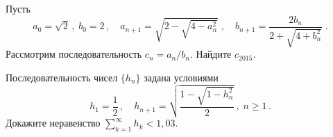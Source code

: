 \begin{problems}
\item
Пусть
\[
    a_0 = \sqrt{2}
\, , \;
    b_0 = 2
\, , \quad
    a_{n+1} = \sqrt{\textstyle 2 - \sqrt{4 - a^2_n}}
\; , \quad
    b_{n+1} = \frac{2 b_n}{2 + \sqrt{4 + b^2_n}}
\; . \]
Рассмотрим последовательность $c_n = a_n / b_n$.
Найдите $c_{2015}$.

\item
Последовательность чисел $\{ h_n \}$ задана условиями
\[
    h_1 = \frac{1}{2}
\, , \quad
    h_{n+1} = \sqrt{\frac{1 - \sqrt{1 - h_n^2}}{2}}
\, , \;
    n \geq 1
\, . \]
Докажите неравенство
\(
    \sum_{k=1}^\infty
        h_k
<
    1{,}03
\).

\end{problems}

\endgroup %

